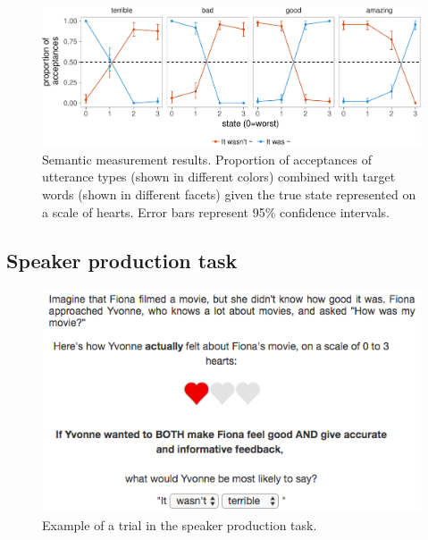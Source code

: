 \documentclass[floatsintext,mask,man]{apa6}
\theoremstyle{definition}
\theoremstyle{definition}
\theoremstyle{definition}
\theoremstyle{remark}
\begin{document}
\begin{figure}[!h]
\includegraphics[width=\textwidth]{polite_NHB_anonymous_files/figure-latex/litsem-1} \caption{Semantic measurement results. Proportion of acceptances of utterance types (shown in different colors) combined with target words (shown in different facets) given the true state represented on a scale of hearts. Error bars represent 95\% confidence intervals.}\label{fig:litsem}
\end{figure}

\subsection{Speaker production task}\label{speaker-production-task}

\begin{figure}[!h]
\includegraphics[width=\textwidth]{fig/screenshot} \caption{Example of a trial in the speaker production task.}\label{fig:screenshot}
\end{figure}
\end{document}
